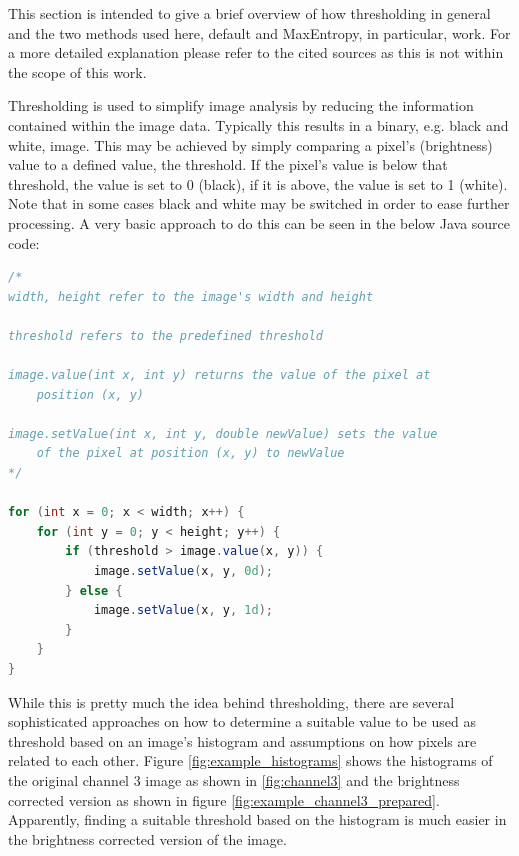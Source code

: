 \documentclass[a4paper, 12pt]{article}
\begin{document}
This section is intended to give a brief overview of how thresholding in general
and the two methods used here, default and MaxEntropy, in particular, work. For
a more detailed explanation please refer to the cited sources as this is not
within the scope of this work.

Thresholding is used to simplify image analysis by reducing the information
contained within the image data. Typically this results in a binary, e.g. black
and white, image. This may be achieved by simply comparing a pixel's
(brightness) value to a defined value, the threshold. If the pixel's value is
below that threshold, the value is set to 0 (black), if it is above, the value
is set to 1 (white). Note that in some cases black and white may be switched in
order to ease further processing. A very basic approach to do this can be seen
in the below Java source code:

\begin{lstlisting}[language=Java, caption=Basic thresholding algorithm]
/*
width, height refer to the image's width and height

threshold refers to the predefined threshold

image.value(int x, int y) returns the value of the pixel at 
	position (x, y)

image.setValue(int x, int y, double newValue) sets the value 
	of the pixel at position (x, y) to newValue
*/

for (int x = 0; x < width; x++) {
	for (int y = 0; y < height; y++) {
		if (threshold > image.value(x, y)) {
			image.setValue(x, y, 0d);
		} else {
			image.setValue(x, y, 1d);
		}
	}
}
\end{lstlisting}

While this is pretty much the idea behind thresholding, there are several
sophisticated approaches on how to determine a suitable value to be used as
threshold based on an image's histogram and assumptions on how pixels are
related to each other. Figure \ref{fig:example_histograms} shows the histograms
of the original channel 3 image as shown in \ref{fig:channel3} and the
brightness corrected version as shown in figure
\ref{fig:example_channel3_prepared}. Apparently, finding a suitable threshold
based on the histogram is much easier in the brightness corrected version of
the image.
\end{document}
